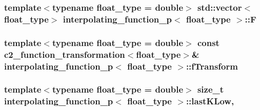 \subsubsection[{\texorpdfstring{F}{F}}]{\setlength{\rightskip}{0pt plus 5cm}template$<$typename float\+\_\+type = double$>$ std\+::vector$<$float\+\_\+type$>$ {\bf interpolating\+\_\+function\+\_\+p}$<$ float\+\_\+type $>$\+::F\hspace{0.3cm}{\ttfamily [protected]}}\hypertarget{classinterpolating__function__p_a481dee592a5a5ec9ec3fb1aae31a8865}{}\label{classinterpolating__function__p_a481dee592a5a5ec9ec3fb1aae31a8865}
\subsubsection[{\texorpdfstring{f\+Transform}{fTransform}}]{\setlength{\rightskip}{0pt plus 5cm}template$<$typename float\+\_\+type = double$>$ const {\bf c2\+\_\+function\+\_\+transformation}$<$float\+\_\+type$>$\& {\bf interpolating\+\_\+function\+\_\+p}$<$ float\+\_\+type $>$\+::f\+Transform}\hypertarget{classinterpolating__function__p_a51af1a7077b6f904abe2ede816972eb7}{}\label{classinterpolating__function__p_a51af1a7077b6f904abe2ede816972eb7}
\subsubsection[{\texorpdfstring{last\+K\+Low}{lastKLow}}]{\setlength{\rightskip}{0pt plus 5cm}template$<$typename float\+\_\+type = double$>$ size\+\_\+t {\bf interpolating\+\_\+function\+\_\+p}$<$ float\+\_\+type $>$\+::last\+K\+Low\hspace{0.3cm}{\ttfamily [mutable]}, {\ttfamily [protected]}}\hypertarget{classinterpolating__function__p_a2f051073f09c909c5770a324862099b6}{}\label{classinterpolating__function__p_a2f051073f09c909c5770a324862099b6}
